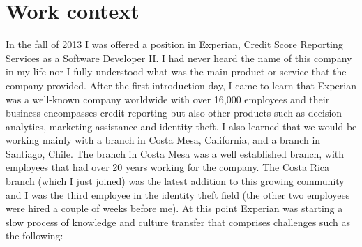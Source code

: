 \documentclass[12pt, letterpaper]{article}
\begin{document}
 
\section{Work context}

In the fall of 2013 I was offered a position in Experian, Credit Score Reporting Services as a Software Developer II.
I had never heard the name of this company in my life nor I fully understood what was the main product or service that 
the company provided. 
After the first introduction day, I came to learn that Experian was a well-known company worldwide with over 16,000
employees and their business encompasses credit reporting but also other products such as decision 
analytics, marketing assistance and identity theft. I also learned that we would be working mainly with a branch in 
Costa Mesa, California, and a branch in Santiago, Chile. The branch in Costa Mesa was a well established branch, with 
employees that had over 20 years working for the company. The Costa Rica branch (which I just joined) was the latest addition to this growing 
community and I was the third employee in the identity theft field (the other two employees were hired a couple of 
weeks before me). At this point Experian was starting a slow process of knowledge and culture transfer that comprises 
challenges such as the following:
\end{document}
